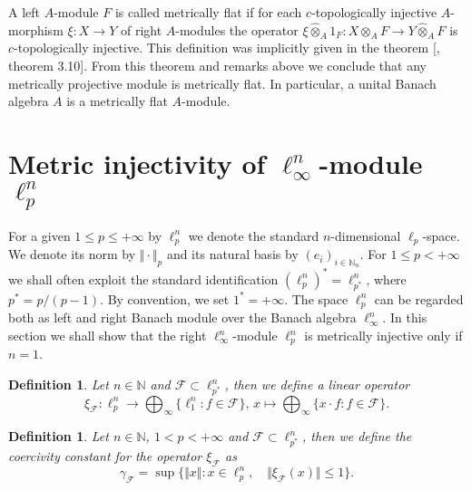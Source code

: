 \documentclass[12pt]{article}
\newtheorem{definition}[theorem]{Definition}
\newcommand{\projmodtens}[1]{\mathbin{\widehat{\otimes}}_{#1}}
\begin{document}
A left $A$-module $F$ is called metrically flat if for each $c$-topologically 
injective $A$-morphism $\xi:X\to Y$ of right $A$-modules the 
operator $\xi\projmodtens{A} 1_F:X\projmodtens{A} F\to Y\projmodtens{A} F$ 
is $c$-topologically injective. This definition was implicitly given in the 
theorem [\cite{GravInjProjBanMod}, theorem 3.10]. From this theorem and remarks 
above we conclude that any metrically projective module is metrically flat. In
particular, a unital Banach algebra $A$ is a metrically flat $A$-module.


\section{Metric injectivity of \texorpdfstring{$\ell_\infty^n$}{linftyn}-module 
\texorpdfstring{$\ell_p^n$}{lpn}}
\label{MetrInjlinftynlpn}

For a given $1\leq p\leq +\infty$ by $\ell_p^n$ we denote the 
standard $n$-dimensional $\ell_p$-space. We denote its norm 
by $\Vert\cdot\Vert_p$ and its natural basis by $(e_i)_{i\in\mathbb{N}_n}$. For 
$1\leq p<+\infty$ we shall often exploit the standard 
identification $(\ell_p^n)^*=\ell_{p^*}^n$, where $p^*=p/(p-1)$. By convention, 
we set $1^*=+\infty$. The space $\ell_p^n$ can be regarded both as left and 
right Banach module over the Banach algebra $\ell_\infty^n$. In this section 
we shall show that the right $\ell_{\infty}^n$-module $\ell_p^n$ is metrically 
injective only if $n=1$.

\begin{definition}\label{StdEmbd} 
    Let $n\in\mathbb{N}$ and $\mathcal{F}\subset\ell_{p^*}^n$, then we define
    a linear operator
    \[
        \xi_{\mathcal{F}}: 
        \ell_{p}^n \to \bigoplus_{\infty} \{ \ell_1^n: f\in\mathcal{F}\},\,
        x \mapsto \bigoplus_{\infty}\{ x\cdot f: f\in\mathcal{F}\}.
    \]
\end{definition}

\begin{definition}\label{StdEmbdCoercv}
    Let $n\in\mathbb{N}$, $1<p<+\infty$ and $\mathcal{F}\subset \ell_{p^*}^n$, 
    then we define the coercivity constant for the operator $\xi_{\mathcal{F}}$ 
    as
    \[
        \gamma_{\mathcal{F}}=\sup\{
            \Vert x\Vert: 
            x\in\ell_{p}^n,\quad \Vert \xi_{\mathcal{F}}(x)\Vert\leq 1
        \}.
    \]
\end{definition}
\end{document}
